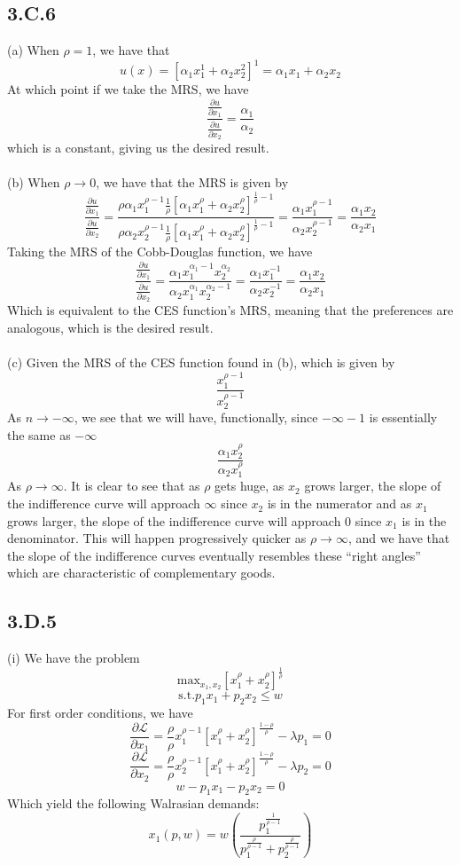 \documentclass[letterpaper,12pt]{article}
\theoremstyle{definition}
\begin{document}
\subsection*{3.C.6}
(a) When $\rho = 1$, we have that 
\[u(x) = [\alpha_1x_1^1 + \alpha_2x_2^2]^{1} = \alpha_1x_1 + \alpha_2x_2\]
At which point if we take the MRS, we have
\[\frac{\frac{\partial u}{\partial x_1}}{\frac{\partial u}{\partial x_2}} = \frac{\alpha_1}{\alpha_2}\]
which is a constant, giving us the desired result.\\\\
(b) When $\rho \to 0$, we have that the MRS is given by
\[\frac{\frac{\partial u}{\partial x_1}}{\frac{\partial u}{\partial x_2}} 
= \frac{\rho \alpha_1 x_1^{\rho-1} \frac{1}{\rho} [ \alpha_1 x_1^\rho + \alpha_2 x_2^\rho]^{\frac{1}{\rho}-1}}{\rho \alpha_2 x_2^{\rho-1} \frac{1}{\rho} [ \alpha_1 x_1^\rho + \alpha_2 x_2^\rho]^{\frac{1}{\rho}-1} }
= \frac{\alpha_1x_1^{\rho-1}}{\alpha_2x_2^{\rho-1}} = 
\frac{\alpha_1x_2}{\alpha_2x_1}\]
Taking the MRS of the Cobb-Douglas function, we have
\[\frac{\frac{\partial u}{\partial x_1}}{\frac{\partial u}{\partial x_2}}  = \frac{\alpha_1 x_1^{\alpha_1 -1} x_2^{\alpha_2}}{\alpha_2 x_1^{\alpha_1} x_2^{\alpha_2-1}} = \frac{\alpha_1 x_1^{-1}}{\alpha_2 x_2^{-1}} = \frac{\alpha_1 x_2}{\alpha_2 x_1}\]
Which is equivalent to the CES function's MRS, meaning that the preferences are analogous, which is the desired result.\\\\
(c) Given the MRS of the CES function found in (b), which is given by 
\[ \frac{x_1^{\rho-1}}{x_2^{\rho-1}}\]
As $n \to -\infty$, we see that we will have, functionally, since $-\infty -1$ is essentially the same as $-\infty$
\[ \frac{\alpha_1 x_2^\rho}{\alpha_2 x_1^\rho} \]
As $\rho \to \infty$.
It is clear to see that as $\rho$ gets huge, as $x_2$ grows larger, the slope of the indifference curve will approach $\infty$ since $x_2$ is in the numerator and as $x_1$ grows larger, the slope of the indifference curve will approach $0$ since $x_1$ is in the denominator. This will happen progressively quicker as $\rho \to \infty$, and we have that the slope of the indifference curves eventually resembles these ``right angles'' which are characteristic of complementary goods.

\subsection*{3.D.5}
(i) We have the problem
\[ \text{max}_{x_1,x_2} \left[ x_1^\rho + x_2^\rho \right]^{\frac{1}{\rho}} \]
\[ \text{s.t.} p_1x_1 + p_2x_2 \leq w \]
For first order conditions, we have
\[\frac{\partial \mathscr{L}}{\partial x_1} = \frac{\rho}{\rho} x_1^{\rho-1} \left[ x_1^\rho + x_2^\rho \right]^\frac{1 -\rho}{\rho} - \lambda p_1 = 0\]
\[\frac{\partial \mathscr{L}}{\partial x_2} = \frac{\rho}{\rho} x_2^{\rho-1} \left[ x_1^\rho + x_2^\rho \right]^\frac{1 -\rho}{\rho} - \lambda p_2 = 0\]
\[w - p_1x_1 - p_2x_2 = 0\]
Which yield the following Walrasian demands:
\[ x_1(p,w) = w \left( \frac{p_1^{\frac{1}{\rho-1}}}{p_1^{\frac{\rho}{\rho-1}} + p_2^{\frac{\rho}{\rho-1}}} \right)\]
\end{document}
